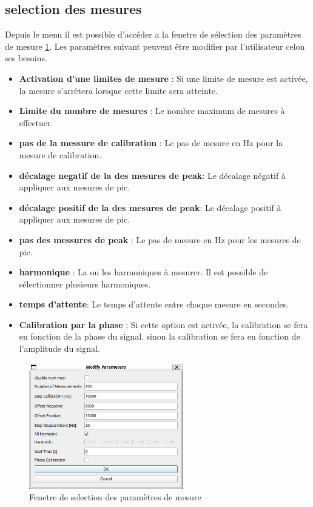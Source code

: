 \subsection{selection des mesures}
Depuis le menu il est possible d'accéder a la fenetre de sélection des paramètres de mesure \ref{fig:paramerter window}.
Les paramètres suivant peuvent être modifier par l'utilisateur celon ses besoins.
\begin{itemize}
    \item \textbf{Activation d'une limites de mesure} : Si une limite de mesure est activée, la mesure s'arrêtera lorsque cette limite sera atteinte.
    \item \textbf{Limite du nombre de mesures} : Le nombre maximum de mesures à effectuer.
    \item \textbf{pas de la messure de calibration} : Le pas de mesure en Hz pour la mesure de calibration.
    \item \textbf{décalage negatif de la des mesures de peak}: Le décalage négatif à appliquer aux mesures de pic.
    \item \textbf{décalage positif de la des mesures de peak}: Le décalage positif à appliquer aux mesures de pic.
    \item \textbf{pas des messures de peak} : Le pas de mesure en Hz pour les mesures de pic.
    \item \textbf{harmonique} : La ou les harmoniques à mesurer. Il est possible de sélectionner plusieurs harmoniques.
    \item \textbf{temps d'attente}: Le temps d'attente entre chaque mesure en secondes.
    \item \textbf{Calibration par la phase} : Si cette option est activée, la calibration se fera en fonction de la phase du signal. sinon la calibration se fera en fonction de l'amplitude du signal.
\end{itemize}

\begin{figure}[H]
    \centering
    \includegraphics[width=0.6\textwidth]{assets/figures/Parameter_window.png}
    \caption{Fenetre de selection des paramètres de mesure}
    \label{fig:paramerter window}
\end{figure}

